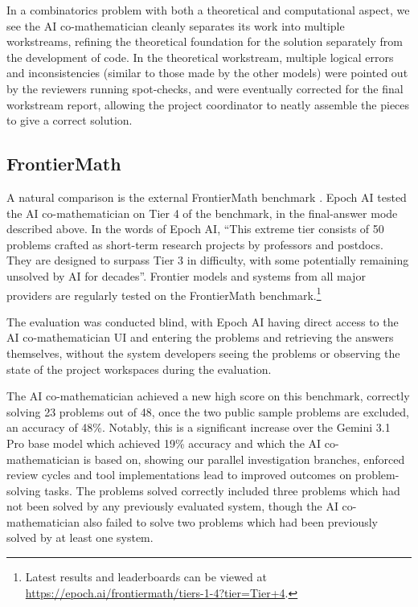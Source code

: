 \documentclass[11pt, a4paper, copyright, gdm]{google}
\begin{document}
%
In a combinatorics problem with both a theoretical and computational aspect, we see the AI co-mathematician cleanly separates its work into multiple workstreams, refining the theoretical foundation for the solution separately from the development of code.
In the theoretical workstream, multiple logical errors and inconsistencies (similar to those made by the other models) were pointed out by the reviewers running spot-checks, and were eventually corrected for the final workstream report, allowing the project coordinator to neatly assemble the pieces to give a correct solution.

\subsection{FrontierMath}

A natural comparison is the external FrontierMath benchmark \citep{glazer2024}.
Epoch AI tested the AI co-mathematician on Tier 4 of the benchmark, in the final-answer mode described above. In the words of Epoch AI, ``This extreme tier consists of 50 problems crafted as short-term research projects by professors and postdocs. They are designed to surpass Tier 3 in difficulty, with some potentially remaining unsolved by AI for decades''. Frontier models and systems from all major providers are regularly tested on the FrontierMath benchmark.\footnote{Latest results and leaderboards can be viewed at \url{https://epoch.ai/frontiermath/tiers-1-4?tier=Tier+4}.}

The evaluation was conducted blind, with Epoch AI having direct access to the AI co-mathematician UI and entering the problems and retrieving the answers themselves, without the system developers seeing the problems or observing the state of the project workspaces during the evaluation.

The AI co-mathematician achieved a new high score on this benchmark, correctly solving 23 problems out of 48, once the two public sample problems are excluded, an accuracy of 48\%. Notably, this is a significant increase over the Gemini 3.1 Pro base model which achieved 19\% accuracy and which the AI co-mathematician is based on, showing our parallel investigation branches, enforced review cycles and tool implementations lead to improved outcomes on problem-solving tasks. The problems solved correctly included three problems which had not been solved by any previously evaluated system, though the AI co-mathematician also failed to solve two problems which had been previously solved by at least one system. 
\end{document}
